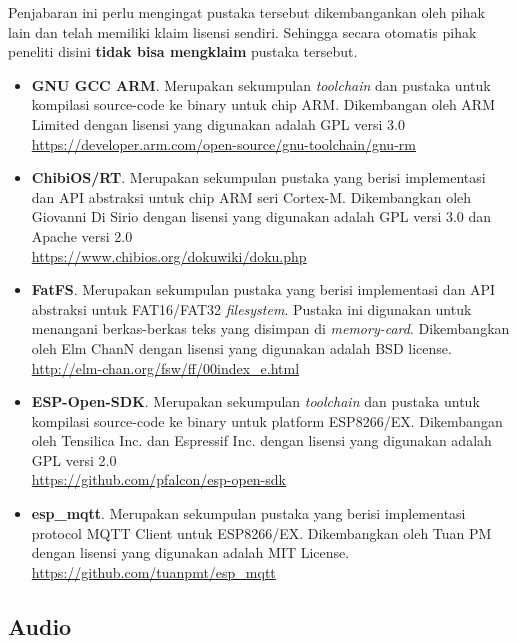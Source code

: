 \documentclass[12pt,]{article}
\begin{document}
	Penjabaran ini perlu mengingat pustaka tersebut dikembangankan oleh pihak lain dan telah memiliki klaim lisensi sendiri.
	Sehingga secara otomatis pihak peneliti disini \textbf{tidak bisa mengklaim} pustaka tersebut.
	
	\begin{itemize}
		\item \textbf{GNU GCC ARM}. Merupakan sekumpulan \textit{toolchain} dan pustaka untuk kompilasi source-code ke binary untuk chip ARM.
		Dikembangan oleh ARM Limited dengan lisensi yang digunakan adalah GPL versi 3.0\\
		\url{https://developer.arm.com/open-source/gnu-toolchain/gnu-rm}
		
		\item \textbf{ChibiOS/RT}. Merupakan sekumpulan pustaka yang berisi implementasi dan API abstraksi untuk chip ARM seri Cortex-M.
		Dikembangkan oleh Giovanni Di Sirio dengan lisensi yang digunakan adalah GPL versi 3.0 dan Apache versi 2.0\\
		\url{https://www.chibios.org/dokuwiki/doku.php}
		
		\item \textbf{FatFS}. Merupakan sekumpulan pustaka yang berisi implementasi dan API abstraksi untuk FAT16/FAT32 \textit{filesystem}.
		Pustaka ini digunakan untuk menangani berkas-berkas teks yang disimpan di \textit{memory-card}.
		Dikembangkan oleh Elm ChanN dengan lisensi yang digunakan adalah BSD license.\\
		\url{http://elm-chan.org/fsw/ff/00index_e.html}
		
		\item \textbf{ESP-Open-SDK}. Merupakan sekumpulan \textit{toolchain} dan pustaka untuk kompilasi source-code ke binary untuk platform ESP8266/EX.
		Dikembangan oleh Tensilica Inc. dan Espressif Inc. dengan lisensi yang digunakan adalah GPL versi 2.0\\
		\url{https://github.com/pfalcon/esp-open-sdk}
		
		\item \textbf{esp\_mqtt}. Merupakan sekumpulan pustaka yang berisi implementasi protocol MQTT Client untuk ESP8266/EX.
		Dikembangkan oleh Tuan PM dengan lisensi yang digunakan adalah MIT License.\\
		\url{https://github.com/tuanpmt/esp_mqtt}
	\end{itemize}

	\subsection{Audio}
	
\end{document}
